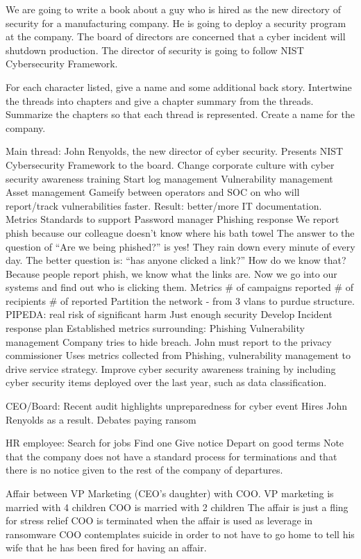 We are going to write a book about a guy who is hired as the new directory of security for a manufacturing company. He is going to deploy a security program at the company.
The board of directors are concerned that a cyber incident will shutdown production.
The director of security is going to follow NIST Cybersecurity Framework.

For each character listed, give a name and some additional back story.
Intertwine the threads into chapters and give a chapter summary from the threads.
Summarize the chapters so that each thread is represented.
Create a name for the company.

Main thread: John Renyolds, the new director of cyber security.
Presents NIST Cybersecurity Framework to the board.
Change corporate culture with cyber security awareness training
Start log management
Vulnerability management
Asset management
Gameify between operators and SOC on who will report/track vulnerabilities faster. Result: better/more IT documentation.
Metrics
Standards to support
Password manager
Phishing response
We report phish because our colleague doesn’t know where his bath towel
The answer to the question of “Are we being phished?” is yes! They rain down every minute of every day.
The better question is: “has anyone clicked a link?”
How do we know that?
Because people report phish, we know what the links are.
Now we go into our systems and find out who is clicking them.
Metrics
# of campaigns reported
# of recipients
# of reported
Partition the network - from 3 vlans to purdue structure.
PIPEDA: real risk of significant harm
Just enough security
Develop Incident response plan
Established metrics surrounding:
Phishing
Vulnerability management
Company tries to hide breach. 
John must report to the privacy commissioner
Uses metrics collected from Phishing, vulnerability management to drive service strategy.
Improve cyber security awareness training by including cyber security items deployed over the last year, such as data classification.

CEO/Board:
Recent audit highlights unpreparedness for cyber event
Hires John Renyolds as a result.
Debates paying ransom

HR employee:
Search for jobs
Find one
Give notice
Depart on good terms
Note that the company does not have a standard process for terminations and that there is no notice given to the rest of the company of departures.

Affair between VP Marketing (CEO’s daughter) with COO.
VP marketing is married with 4 children
COO is married with 2 children
The affair is just a fling for stress relief
COO is terminated when the affair is used as leverage in ransomware
COO contemplates suicide in order to not have to go home to tell his wife that he has been fired for having an affair.

